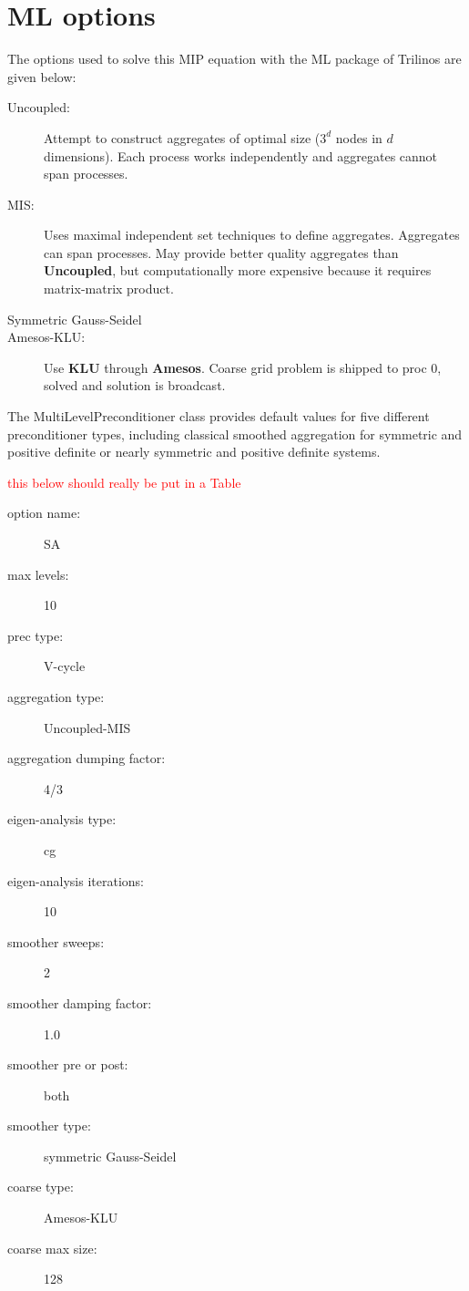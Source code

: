 \appendix
\section{ML options}

The options used to solve this MIP equation with the ML package of Trilinos \cite{ml_guide} are given below:
\begin{description}
\item [Uncoupled:] Attempt to construct aggregates of optimal size ($3^d$
nodes in $d$ dimensions). Each process works independently and aggregates
cannot span processes.
\item [MIS:] Uses maximal independent set techniques \cite{mis} to define
aggregates. Aggregates can span processes. May provide better quality
aggregates than {\bf Uncoupled}, but computationally more expensive because it
requires matrix-matrix product.
\item[Symmetric Gauss-Seidel] 
\item[Amesos-KLU:] Use {\bf KLU} through {\bf Amesos}. Coarse grid problem is
shipped to proc 0, solved and solution is broadcast.
\end{description}
The MultiLevelPreconditioner class provides default values for five different
preconditioner types, including classical smoothed aggregation for symmetric
and positive definite or nearly symmetric and positive definite systems.

\textcolor{red}{this below should really be put in a Table}
\begin{description}
\item [option name:] SA
\item [max levels:] 10
\item [prec type:] V-cycle
\item [aggregation type:] Uncoupled-MIS
\item [aggregation dumping factor:] 4/3
\item [eigen-analysis type:] cg
\item [eigen-analysis iterations:] 10
\item [smoother sweeps:] 2
\item [smoother damping factor:] 1.0
\item [smoother pre or post:] both
\item [smoother type:] symmetric Gauss-Seidel
\item [coarse type:] Amesos-KLU
\item [coarse max size:] 128
\end{description}
